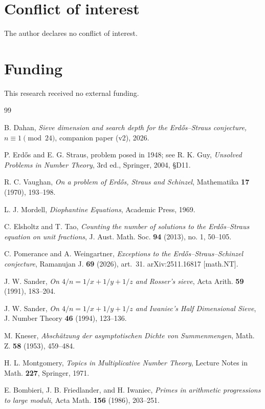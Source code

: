 \documentclass[11pt, a4paper]{article}
\theoremstyle{plain}
\theoremstyle{definition}
\begin{document}
\section*{Conflict of interest}
The author declares no conflict of interest.

\section*{Funding}
This research received no external funding.

\begin{thebibliography}{99}

 B. Dahan, \textit{Sieve dimension and search depth for the Erd\H{o}s--Straus conjecture, $n\equiv1\pmod{24}$}, companion paper (v2), 2026.

 P. Erd\H{o}s and E. G. Straus, problem posed in 1948; see R. K. Guy, \textit{Unsolved Problems in Number Theory}, 3rd ed., Springer, 2004, \S D11.

 R. C. Vaughan, \textit{On a problem of Erd\H{o}s, Straus and Schinzel}, Mathematika \textbf{17} (1970), 193--198.

 L. J. Mordell, \textit{Diophantine Equations}, Academic Press, 1969.

 C. Elsholtz and T. Tao, \textit{Counting the number of solutions to the Erd\H{o}s--Straus equation on unit fractions}, J. Aust. Math. Soc. \textbf{94} (2013), no. 1, 50--105.

 C. Pomerance and A. Weingartner, \textit{Exceptions to the Erd\H{o}s--Straus--Schinzel conjecture}, Ramanujan J. \textbf{69} (2026), art.~31. arXiv:2511.16817 [math.NT].

 J. W. Sander, \textit{On $4/n=1/x+1/y+1/z$ and Rosser's sieve}, Acta Arith. \textbf{59} (1991), 183--204.

 J. W. Sander, \textit{On $4/n=1/x+1/y+1/z$ and Iwaniec's Half Dimensional Sieve}, J. Number Theory \textbf{46} (1994), 123--136.

 M. Kneser, \textit{Absch\"{a}tzung der asymptotischen Dichte von Summenmengen}, Math. Z. \textbf{58} (1953), 459--484.

 H. L. Montgomery, \textit{Topics in Multiplicative Number Theory}, Lecture Notes in Math. \textbf{227}, Springer, 1971.

 E. Bombieri, J. B. Friedlander, and H. Iwaniec, \textit{Primes in arithmetic progressions to large moduli}, Acta Math. \textbf{156} (1986), 203--251.


\end{thebibliography}
\end{document}
